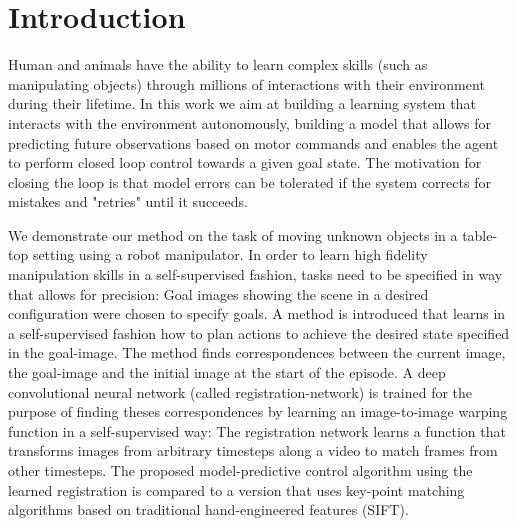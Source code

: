 \section{Introduction}

Human and animals have the ability to learn complex skills (such as manipulating objects) through millions of interactions with their environment during their lifetime. In this work we aim at building a learning system that interacts with the environment autonomously, building a model that allows for predicting future observations based on motor commands and enables the agent to perform closed loop control towards a given goal state. The motivation for closing the loop is that model errors can be tolerated if the system corrects for mistakes and "retries" until it succeeds. 



We demonstrate our method on the task of moving unknown objects in a table-top setting using a robot manipulator. In order to learn high fidelity manipulation skills in a self-supervised fashion, tasks need to be specified in way that allows for precision: Goal images showing the scene in a desired configuration were chosen to specify goals. A method is introduced that learns in a self-supervised fashion how to plan actions to achieve the desired state specified in the goal-image. The method finds correspondences between the current image, the goal-image and the initial image at the start of the episode. A deep convolutional neural network (called registration-network) is trained for the purpose of finding theses correspondences by learning an image-to-image warping function in a self-supervised way: The registration network learns a function that transforms images from arbitrary timesteps along a video to match frames from other timesteps.
The proposed model-predictive control algorithm using the learned registration is compared to a version that uses key-point matching algorithms based on traditional hand-engineered features (SIFT). 

